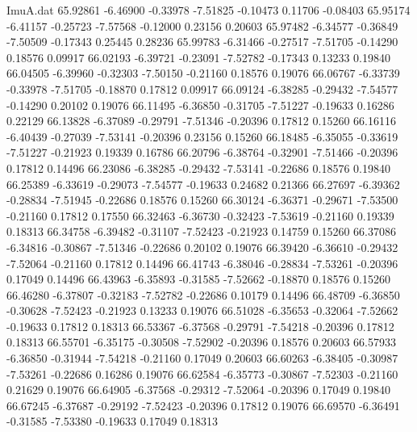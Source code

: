 \begin{filecontents}{ImuA.dat}
  65.92861   -6.46900   -0.33978   -7.51825   -0.10473    0.11706   -0.08403
  65.95174   -6.41157   -0.25723   -7.57568   -0.12000    0.23156    0.20603
  65.97482   -6.34577   -0.36849   -7.50509   -0.17343    0.25445    0.28236
  65.99783   -6.31466   -0.27517   -7.51705   -0.14290    0.18576    0.09917
  66.02193   -6.39721   -0.23091   -7.52782   -0.17343    0.13233    0.19840
  66.04505   -6.39960   -0.32303   -7.50150   -0.21160    0.18576    0.19076
  66.06767   -6.33739   -0.33978   -7.51705   -0.18870    0.17812    0.09917
  66.09124   -6.38285   -0.29432   -7.54577   -0.14290    0.20102    0.19076
  66.11495   -6.36850   -0.31705   -7.51227   -0.19633    0.16286    0.22129
  66.13828   -6.37089   -0.29791   -7.51346   -0.20396    0.17812    0.15260
  66.16116   -6.40439   -0.27039   -7.53141   -0.20396    0.23156    0.15260
  66.18485   -6.35055   -0.33619   -7.51227   -0.21923    0.19339    0.16786
  66.20796   -6.38764   -0.32901   -7.51466   -0.20396    0.17812    0.14496
  66.23086   -6.38285   -0.29432   -7.53141   -0.22686    0.18576    0.19840
  66.25389   -6.33619   -0.29073   -7.54577   -0.19633    0.24682    0.21366
  66.27697   -6.39362   -0.28834   -7.51945   -0.22686    0.18576    0.15260
  66.30124   -6.36371   -0.29671   -7.53500   -0.21160    0.17812    0.17550
  66.32463   -6.36730   -0.32423   -7.53619   -0.21160    0.19339    0.18313
  66.34758   -6.39482   -0.31107   -7.52423   -0.21923    0.14759    0.15260
  66.37086   -6.34816   -0.30867   -7.51346   -0.22686    0.20102    0.19076
  66.39420   -6.36610   -0.29432   -7.52064   -0.21160    0.17812    0.14496
  66.41743   -6.38046   -0.28834   -7.53261   -0.20396    0.17049    0.14496
  66.43963   -6.35893   -0.31585   -7.52662   -0.18870    0.18576    0.15260
  66.46280   -6.37807   -0.32183   -7.52782   -0.22686    0.10179    0.14496
  66.48709   -6.36850   -0.30628   -7.52423   -0.21923    0.13233    0.19076
  66.51028   -6.35653   -0.32064   -7.52662   -0.19633    0.17812    0.18313
  66.53367   -6.37568   -0.29791   -7.54218   -0.20396    0.17812    0.18313
  66.55701   -6.35175   -0.30508   -7.52902   -0.20396    0.18576    0.20603
  66.57933   -6.36850   -0.31944   -7.54218   -0.21160    0.17049    0.20603
  66.60263   -6.38405   -0.30987   -7.53261   -0.22686    0.16286    0.19076
  66.62584   -6.35773   -0.30867   -7.52303   -0.21160    0.21629    0.19076
  66.64905   -6.37568   -0.29312   -7.52064   -0.20396    0.17049    0.19840
  66.67245   -6.37687   -0.29192   -7.52423   -0.20396    0.17812    0.19076
  66.69570   -6.36491   -0.31585   -7.53380   -0.19633    0.17049    0.18313

\end{filecontents}
